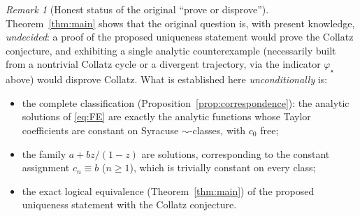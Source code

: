 \documentclass{amsart}
\theoremstyle{remark}
\newtheorem{remark}{Remark}
\begin{document}
\begin{remark}[Honest status of the original ``prove or disprove'']
Theorem~\ref{thm:main} shows that the original question is, with present knowledge,
\emph{undecided}: a proof of the proposed uniqueness statement would prove the Collatz conjecture,
and exhibiting a single analytic counterexample (necessarily built from a nontrivial Collatz cycle
or a divergent trajectory, via the indicator $\varphi_\star$ above) would disprove Collatz. What is
established here \emph{unconditionally} is:
\begin{itemize}
\item the complete classification (Proposition~\ref{prop:correspondence}): the analytic solutions
of \eqref{eq:FE} are exactly the analytic functions whose Taylor coefficients are constant on
Syracuse $\sim$-classes, with $c_0$ free;
\item the family $a+bz/(1-z)$ are solutions, corresponding to the constant assignment
$c_n\equiv b$ ($n\ge1$), which is trivially constant on every class;
\item the exact logical equivalence (Theorem~\ref{thm:main}) of the proposed uniqueness statement
with the Collatz conjecture.
\end{itemize}
\end{remark}
\end{document}
